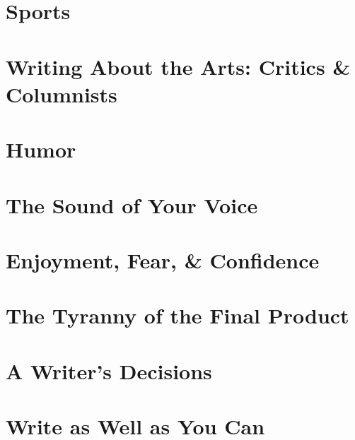 \documentclass{article}
\begin{document}

\section{Sports}


\section{Writing About the Arts: Critics \& Columnists}


\section{Humor}


\section{The Sound of Your Voice}


\section{Enjoyment, Fear, \& Confidence}


\section{The Tyranny of the Final Product}


\section{A Writer's Decisions}


\section{Write as Well as You Can}


\printbibliography[heading=bibintoc]
\end{document}
